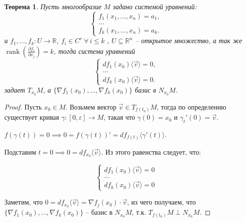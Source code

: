 \documentclass[a5paper]{article}
\newcounter{through}
\theoremstyle{plain}
\newtheorem{theorem}[through]{Теорема}
\theoremstyle{definition}
\numberwithin{through}{section}
\numberwithin{equation}{section}
\DeclareMathOperator{\rank}{rank}
\begin{document}
\begin{theorem}
	Пусть многообразие $M$ задано системой уравнений:
	\begin{equation*}
	\begin{cases}
	f_1(x_1, \ldots, x_n) = a_1,
	\\
	\ldots
	\\
	f_k(x_1, \ldots, x_n) = a_k.
	\end{cases}
	\end{equation*}
	и $f_1, \ldots, f_k : U \to \mathbb{R}$, $f_i \in C^r \; \forall \, i \leq k$ , $U \subseteq \mathbb{R}^n$ -- открытое множество, а так же $\rank (\frac{\partial f_i}{\partial x_j})=k$, тогда система уравнений
	\begin{equation*}
	\begin{cases}
	df_1(x_0)\langle\vec{v}\rangle = 0,
	\\
	\ldots
	\\
	df_k(x_0)\langle\vec{v}\rangle = 0.
	\end{cases}
	\end{equation*}
	задает $T_{x_0}M$, а $\{\nabla f_1(x_0), \ldots, \nabla f_k(x_0)\}$ базис в $N_{x_0}M$.
\end{theorem}

\begin{proof}
	Пусть $x_0 \in M$. Возьмем вектор $\vec{v} \in T_{f(t_0)}M$, тогда по определению существует кривая $\gamma : [0, \varepsilon] \to M$, такая что $\gamma(0) = x_0$ и $\gamma_t'(0) = \vec{v}$.
	
	$f(\gamma(t)) = 0 \implies 0=f(\gamma(t))'=df_{f(t)}\langle\gamma'(t)\rangle$.
	
	Подставим $t=0 \implies 0 = df_{x_0}\langle\vec{v}\rangle$. Из этого равенства следует, что: 
	
	\begin{equation*}
	\begin{cases}
	df_1(x_0)\langle\vec{v}\rangle = 0
	\\
	\ldots
	\\
	df_k(x_0)\langle\vec{v}\rangle = 0
	\end{cases}
	\end{equation*}
	
	Заметим, что $0 = df_{x_0}\langle\vec{v}\rangle = \nabla f_j(x_0) \cdot \vec{v}$, из чего получаем, что 
	\\
	$\{\nabla f_1(x_0), \ldots, \nabla f_k(x_0)\}$ -- базис в $N_{x_0}M$, т.к. $T_{f(t_0)}M \perp N_{x_0}M$.
\end{proof}
\end{document}
